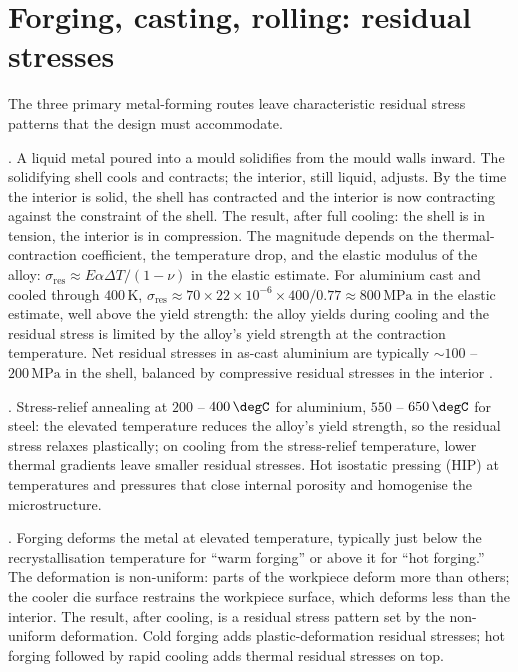 \section{Forging, casting, rolling: residual stresses}

The three primary metal-forming routes leave characteristic residual
stress patterns that the design must accommodate.

. A liquid metal
poured into a mould solidifies from the mould walls inward. The
solidifying shell cools and contracts; the interior, still liquid,
adjusts. By the time the interior is solid, the shell has contracted
and the interior is now contracting against the constraint of the
shell. The result, after full cooling: the shell is in tension, the
interior is in compression. The magnitude depends on the thermal-
contraction coefficient, the temperature drop, and the elastic
modulus of the alloy: $\sigma_{\text{res}} \approx E \alpha \Delta T
/ (1 - \nu)$ in the elastic estimate. For aluminium cast and cooled
through $400\,\si{\kelvin}$, $\sigma_{\text{res}} \approx 70 \times
22 \times 10^{-6} \times 400 / 0.77 \approx 800\,\text{MPa}$ in the
elastic estimate, well above the yield strength: the alloy yields
during cooling and the residual stress is limited by the alloy's
yield strength at the contraction temperature. Net residual stresses
in as-cast aluminium are typically $\sim 100$ -- $200\,\text{MPa}$ in
the shell, balanced by compressive residual stresses in the interior
\cite[ch.~10]{text:dieter-mechanical-metallurgy}.

.
Stress-relief annealing at $200$ -- $400\,\degC$ for aluminium, $550$
-- $650\,\degC$ for steel: the elevated temperature reduces the alloy's
yield strength, so the residual stress relaxes plastically; on cooling
from the stress-relief temperature, lower thermal gradients leave
smaller residual stresses. Hot isostatic pressing (HIP) at temperatures
and pressures that close internal porosity and homogenise the
microstructure.

. Forging deforms the metal at
elevated temperature, typically just below the recrystallisation
temperature for ``warm forging'' or above it for ``hot forging.''
The deformation is non-uniform: parts of the workpiece deform more
than others; the cooler die surface restrains the workpiece surface,
which deforms less than the interior. The result, after cooling, is
a residual stress pattern set by the non-uniform deformation. Cold
forging adds plastic-deformation residual stresses; hot forging
followed by rapid cooling adds thermal residual stresses on top.

